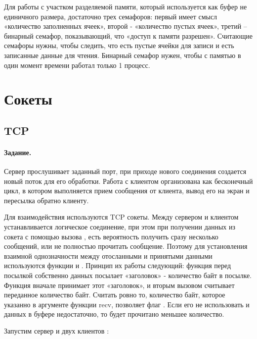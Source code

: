 Для работы с участком разделяемой памяти, который используется как буфер не единичного размера, достаточно трех семафоров: первый имеет смысл «количество заполненных ячеек», второй - «количество пустых ячеек», третий – бинарный семафор, показывающий, что «доступ к памяти разрешен». Считающие семафоры нужны, чтобы следить, что есть пустые ячейки для записи и есть записанные данные для чтения. Бинарный семафор нужен, чтобы с памятью в один момент времени работал только 1 процесс.

\section{Сокеты}

\subsection{TCP}

\paragraph{Задание.} Сервер прослушивает заданный порт, при приходе нового соединения создается новый поток для его обработки. Работа с клиентом организована как бесконечный цикл, в котором выполняется прием сообщения от клиента, вывод его на экран и пересылка обратно клиенту.

Для взаимодействия используются TCP сокеты. Между сервером и клиентом устанавливается логическое соединение, при этом при получении данных из сокета с помощью вызова , есть вероятность получить сразу несколько сообщений, или не полностью прочитать сообщение. Поэтому для установления взаимной однозначности между отосланными и принятыми данными используются функции  и . Принцип их работы следующий: функция  перед посылкой собственно данных посылает «заголовок» - количество байт в посылке. Функция  вначале принимает этот «заголовок», и вторым вызовом  считывает переданное количество байт. Считать ровно то, количество байт, которое указанно в аргументе функции recv, позволяет флаг . Если его не использовать и данных в буфере недостаточно, то будет прочитано меньшее количество.



\newpage

Запустим сервер  и двух клиентов :

